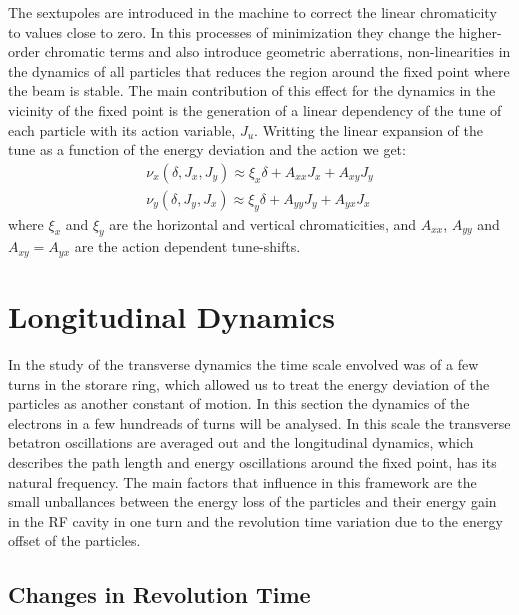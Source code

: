 	The sextupoles are introduced in the machine to correct the linear chromaticity to values close to zero. In this processes of minimization they change the higher-order chromatic terms and also introduce geometric aberrations, non-linearities in the dynamics of all particles that reduces the region around the fixed point where the beam is stable. The main contribution of this effect for the dynamics in the vicinity of the fixed point is the generation of a linear dependency of the tune of each particle with its action variable, $J_u$. Writting the linear expansion of the tune as a function of the energy deviation and the action we get:
	\begin{align}
		\nu_x(\delta, J_x, J_y) \approx \xi_x \delta + A_{xx} J_x + A_{xy} J_y \\\nonumber
		\nu_y(\delta, J_y, J_x) \approx \xi_y \delta + A_{yy} J_y + A_{yx} J_x
	\end{align}
	where $\xi_x$ and $\xi_y$ are the horizontal and vertical chromaticities, and $A_{xx}$, $A_{yy}$ and $A_{xy}=A_{yx}$ are the action dependent tune-shifts.

\section{Longitudinal Dynamics}

    In the study of the transverse dynamics the time scale envolved was of a few turns in the storare ring, which allowed us to treat the energy deviation of the particles as another constant of motion. In this section the dynamics of the electrons in a few hundreads of turns will be analysed. In this scale the transverse betatron oscillations are averaged out and the longitudinal dynamics, which describes the path length and energy oscillations around the fixed point, has its natural frequency. The main factors that influence in this framework are the small unballances between the energy loss of the particles and their energy gain in the RF cavity in one turn and the revolution time variation due to the energy offset of the particles.

\subsection{Changes in Revolution Time}\label{sec:longitudinal_deviations}

